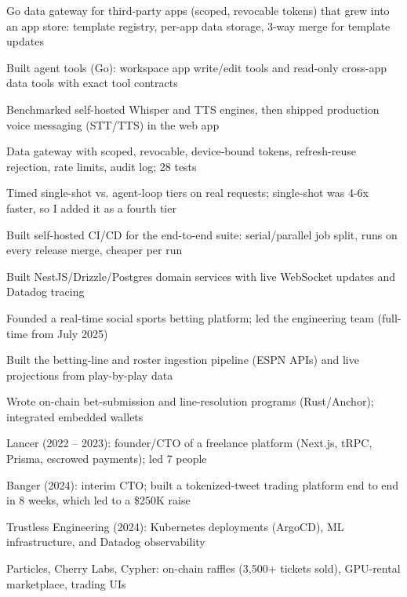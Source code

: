 \documentclass[print]{jack-resume}
\begin{document}
\begin{tightemize}
    \item Go data gateway for third-party apps (scoped, revocable tokens) that grew into an app store: template registry, per-app data storage, 3-way merge for template updates
    \item Built agent tools (Go): workspace app write/edit tools and read-only cross-app data tools with exact tool contracts
    \item Benchmarked self-hosted Whisper and TTS engines, then shipped production voice messaging (STT/TTS) in the web app
    \item Data gateway with scoped, revocable, device-bound tokens, refresh-reuse rejection, rate limits, audit log; 28 tests
    \item Timed single-shot vs. agent-loop tiers on real requests; single-shot was 4-6x faster, so I added it as a fourth tier
    \item Built self-hosted CI/CD for the end-to-end suite: serial/parallel job split, runs on every release merge, cheaper per run
\end{tightemize}
\sectionsep

\begin{tightemize}
    \item Built NestJS/Drizzle/Postgres domain services with live WebSocket updates and Datadog tracing
    \item Founded a real-time social sports betting platform; led the engineering team (full-time from July 2025)
    \item Built the betting-line and roster ingestion pipeline (ESPN APIs) and live projections from play-by-play data
    \item Wrote on-chain bet-submission and line-resolution programs (Rust/Anchor); integrated embedded wallets
\end{tightemize}
\sectionsep

\begin{tightemize}
    \item Lancer (2022 – 2023): founder/CTO of a freelance platform (Next.js, tRPC, Prisma, escrowed payments); led 7 people
    \item Banger (2024): interim CTO; built a tokenized-tweet trading platform end to end in 8 weeks, which led to a \$250K raise
    \item Trustless Engineering (2024): Kubernetes deployments (ArgoCD), ML infrastructure, and Datadog observability
    \item Particles, Cherry Labs, Cypher: on-chain raffles (3,500+ tickets sold), GPU-rental marketplace, trading UIs
\end{tightemize}
\sectionsep
\end{document}
